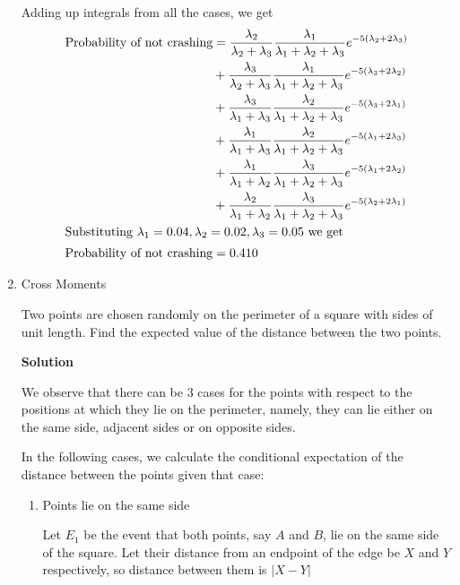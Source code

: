 \documentclass[12pt, oneside]{article}
\begin{document}
\begin{enumerate}
{    Adding up integrals from all the cases, we get
    \begin{align*}
        \text{Probability of not crashing} &= \frac{\lambda_2}{\lambda_2 + \lambda_3} \frac{\lambda_1}{\lambda_1 + \lambda_2 + \lambda_3} e^{-5(\lambda_2 + 2\lambda_3)} \\
             &+ \frac{\lambda_3}{\lambda_2 + \lambda_3} \frac{\lambda_1}{\lambda_1 + \lambda_2 + \lambda_3} e^{-5(\lambda_3 + 2\lambda_2)} \\
             &+ \frac{\lambda_3}{\lambda_1 + \lambda_3} \frac{\lambda_2}{\lambda_1 + \lambda_2 + \lambda_3} e^{-5(\lambda_3 + 2\lambda_1)} \\
             &+ \frac{\lambda_1}{\lambda_1 + \lambda_3} \frac{\lambda_2}{\lambda_1 + \lambda_2 + \lambda_3} e^{-5(\lambda_1 + 2\lambda_3)} \\
             &+ \frac{\lambda_1}{\lambda_1 + \lambda_2} \frac{\lambda_3}{\lambda_1 + \lambda_2 + \lambda_3} e^{-5(\lambda_1 + 2\lambda_2)} \\
             &+ \frac{\lambda_2}{\lambda_1 + \lambda_2} \frac{\lambda_3}{\lambda_1 + \lambda_2 + \lambda_3} e^{-5(\lambda_2 + 2\lambda_1)} \\
        \intertext{Substituting \(\lambda_1 = 0.04, \lambda_2 = 0.02, \lambda_3 = 0.05\) we get}
        \text{Probability of not crashing} &= 0.410
    \end{align*}
}

\item {
    Cross Moments

    Two points are chosen randomly on the perimeter of a square with sides of unit length.
    Find the expected value of the distance between the two points.

    \textbf{Solution}

    We observe that there can be 3 cases for the points with respect to the positions at
    which they lie on the perimeter, namely, they can lie either on the same side, adjacent
    sides or on opposite sides.

    In the following cases, we calculate the conditional expectation of the distance between
    the points given that case:

    \begin{enumerate}
        \item {
            Points lie on the same side

            Let \(E_1\) be the event that both points, say \(A\) and \(B\), lie on
            the same side of the square. Let their distance from an endpoint of the edge
            be \(X\) and \(Y\) respectively, so distance between them is \(|X - Y|\)

}
\end{enumerate}}
\end{enumerate}
\end{document}
